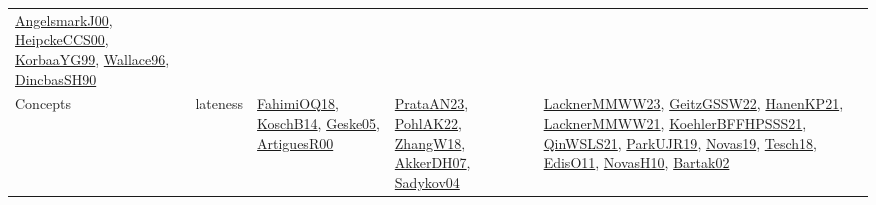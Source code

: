 {\begin{longtable}{lp{3cm}>{\raggedright}p{6cm}>{\raggedright}p{6cm}p{8cm}}
\href{papers/AngelsmarkJ00.pdf}{AngelsmarkJ00}\cite{AngelsmarkJ00}, \href{articles/HeipckeCCS00.pdf}{HeipckeCCS00}\cite{HeipckeCCS00}, \href{papers/KorbaaYG99.pdf}{KorbaaYG99}\cite{KorbaaYG99}, \href{articles/Wallace96.pdf}{Wallace96}\cite{Wallace96}, \href{articles/DincbasSH90.pdf}{DincbasSH90}\cite{DincbasSH90}\\
Concepts & lateness & \href{articles/FahimiOQ18.pdf}{FahimiOQ18}\cite{FahimiOQ18}, \href{papers/KoschB14.pdf}{KoschB14}\cite{KoschB14}, \href{papers/Geske05.pdf}{Geske05}\cite{Geske05}, \href{articles/ArtiguesR00.pdf}{ArtiguesR00}\cite{ArtiguesR00} & \href{articles/PrataAN23.pdf}{PrataAN23}\cite{PrataAN23}, \href{articles/PohlAK22.pdf}{PohlAK22}\cite{PohlAK22}, \href{articles/ZhangW18.pdf}{ZhangW18}\cite{ZhangW18}, \href{papers/AkkerDH07.pdf}{AkkerDH07}\cite{AkkerDH07}, \href{papers/Sadykov04.pdf}{Sadykov04}\cite{Sadykov04} & \href{articles/LacknerMMWW23.pdf}{LacknerMMWW23}\cite{LacknerMMWW23}, \href{papers/GeitzGSSW22.pdf}{GeitzGSSW22}\cite{GeitzGSSW22}, \href{papers/HanenKP21.pdf}{HanenKP21}\cite{HanenKP21}, \href{papers/LacknerMMWW21.pdf}{LacknerMMWW21}\cite{LacknerMMWW21}, \href{articles/KoehlerBFFHPSSS21.pdf}{KoehlerBFFHPSSS21}\cite{KoehlerBFFHPSSS21}, \href{articles/QinWSLS21.pdf}{QinWSLS21}\cite{QinWSLS21}, \href{papers/ParkUJR19.pdf}{ParkUJR19}\cite{ParkUJR19}, \href{articles/Novas19.pdf}{Novas19}\cite{Novas19}, \href{papers/Tesch18.pdf}{Tesch18}\cite{Tesch18}, \href{papers/EdisO11.pdf}{EdisO11}\cite{EdisO11}, \href{articles/NovasH10.pdf}{NovasH10}\cite{NovasH10}, \href{papers/Bartak02.pdf}{Bartak02}\cite{Bartak02}\\

\end{longtable}}
